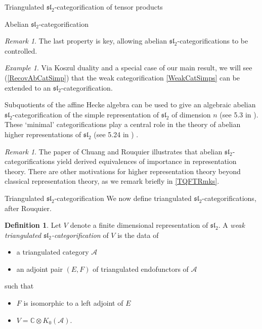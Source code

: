 \documentclass[12pt]{amsart}
\theoremstyle{definition}
\newtheorem{defn}[thm]{Definition}
\theoremstyle{remark}
\newtheorem{rmk}[thm]{Remark}
\theoremstyle{remark}
\newtheorem{ex}[thm]{Example}
\begin{document}
\begin{section}{Triangulated $\mathfrak{sl}_{2}$-categorification of tensor products}
\begin{subsection}{Abelian $\mathfrak{sl}_{2}$-categorification}
\begin{rmk} The last property is key, allowing abelian $\mathfrak{sl}_{2}$-categorifications to be controlled. \end{rmk} 

\begin{ex} Via Koszul duality and a special case of our main result, we will see (\ref{RecovAbCatSimp}) that the weak categorification \ref{WeakCatSimps} can be extended to an $\mathfrak{sl}_{2}$-categorification.  

Subquotients of the affine Hecke algebra can be used to give an algebraic abelian $\mathfrak{sl}_{2}$-categorification of the simple representation of $\mathfrak{sl}_{2}$ of dimension $n$ (see 5.3 in \cite{ChuangRouquierDerivedEquivalencesSymmetricGroupsCategorification}). These `minimal' categorifications play a central role in the theory of abelian higher representations of $\mathfrak{sl}_{2}$ (see 5.24 in \cite{ChuangRouquierDerivedEquivalencesSymmetricGroupsCategorification}) .         
\end{ex}

\begin{rmk} The paper \cite{ChuangRouquierDerivedEquivalencesSymmetricGroupsCategorification} of Chuang and Rouquier illustrates that abelian $\mathfrak{sl}_{2}$-categorifications yield derived equivalences of importance in representation theory. There are other motivations for higher representation theory beyond classical representation theory, as we remark briefly in \ref{TQFTRmks}. \end{rmk} 

\end{subsection}

\begin{subsection}{Triangulated $\mathfrak{sl}_{2}$-categorification} We now define triangulated $\mathfrak{sl}_{2}$-categorifications, after Rouquier.

\begin{defn} Let $V$ denote a finite dimensional representation of $\mathfrak{sl}_{2}$. A {\it weak triangulated $\mathfrak{sl}_{2}$-categorification} of $V$ is the data of \begin{itemize} \item a triangulated category $\mathcal{A}$ \item an adjoint pair $(E,F)$ of triangulated endofunctors of $\mathcal{A}$ \end{itemize} such that \begin{itemize} \item $F$ is isomorphic to a left adjoint of $E$ \item $V= \mathbb{C} \otimes K_{0}(\mathcal{A})$. \end{itemize} \end{defn}


\end{subsection}
\end{section}
\end{document}
